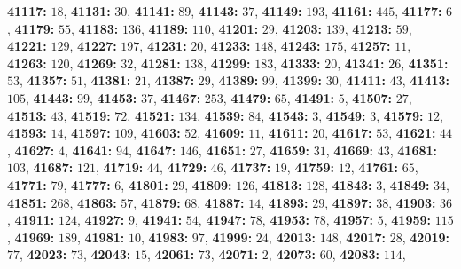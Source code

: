 \textsf{\bfseries 41117:} $18$, \textsf{\bfseries 41131:} $30$, \textsf{\bfseries 41141:} $89$, \textsf{\bfseries 41143:} $37$, \textsf{\bfseries 41149:} $193$, \textsf{\bfseries 41161:} $445$, \textsf{\bfseries 41177:} $6$, \textsf{\bfseries 41179:} $55$, \textsf{\bfseries 41183:} $136$, \textsf{\bfseries 41189:} $110$, \textsf{\bfseries 41201:} $29$, \textsf{\bfseries 41203:} $139$, \textsf{\bfseries 41213:} $59$, \textsf{\bfseries 41221:} $129$, \textsf{\bfseries 41227:} $197$, \textsf{\bfseries 41231:} $20$, \textsf{\bfseries 41233:} $148$, \textsf{\bfseries 41243:} $175$, \textsf{\bfseries 41257:} $11$, \textsf{\bfseries 41263:} $120$, \textsf{\bfseries 41269:} $32$, \textsf{\bfseries 41281:} $138$, \textsf{\bfseries 41299:} $183$, \textsf{\bfseries 41333:} $20$, \textsf{\bfseries 41341:} $26$, \textsf{\bfseries 41351:} $53$, \textsf{\bfseries 41357:} $51$, \textsf{\bfseries 41381:} $21$, \textsf{\bfseries 41387:} $29$, \textsf{\bfseries 41389:} $99$, \textsf{\bfseries 41399:} $30$, \textsf{\bfseries 41411:} $43$, \textsf{\bfseries 41413:} $105$, \textsf{\bfseries 41443:} $99$, \textsf{\bfseries 41453:} $37$, \textsf{\bfseries 41467:} $253$, \textsf{\bfseries 41479:} $65$, \textsf{\bfseries 41491:} $5$, \textsf{\bfseries 41507:} $27$, \textsf{\bfseries 41513:} $43$, \textsf{\bfseries 41519:} $72$, \textsf{\bfseries 41521:} $134$, \textsf{\bfseries 41539:} $84$, \textsf{\bfseries 41543:} $3$, \textsf{\bfseries 41549:} $3$, \textsf{\bfseries 41579:} $12$, \textsf{\bfseries 41593:} $14$, \textsf{\bfseries 41597:} $109$, \textsf{\bfseries 41603:} $52$, \textsf{\bfseries 41609:} $11$, \textsf{\bfseries 41611:} $20$, \textsf{\bfseries 41617:} $53$, \textsf{\bfseries 41621:} $44$, \textsf{\bfseries 41627:} $4$, \textsf{\bfseries 41641:} $94$, \textsf{\bfseries 41647:} $146$, \textsf{\bfseries 41651:} $27$, \textsf{\bfseries 41659:} $31$, \textsf{\bfseries 41669:} $43$, \textsf{\bfseries 41681:} $103$, \textsf{\bfseries 41687:} $121$, \textsf{\bfseries 41719:} $44$, \textsf{\bfseries 41729:} $46$, \textsf{\bfseries 41737:} $19$, \textsf{\bfseries 41759:} $12$, \textsf{\bfseries 41761:} $65$, \textsf{\bfseries 41771:} $79$, \textsf{\bfseries 41777:} $6$, \textsf{\bfseries 41801:} $29$, \textsf{\bfseries 41809:} $126$, \textsf{\bfseries 41813:} $128$, \textsf{\bfseries 41843:} $3$, \textsf{\bfseries 41849:} $34$, \textsf{\bfseries 41851:} $268$, \textsf{\bfseries 41863:} $57$, \textsf{\bfseries 41879:} $68$, \textsf{\bfseries 41887:} $14$, \textsf{\bfseries 41893:} $29$, \textsf{\bfseries 41897:} $38$, \textsf{\bfseries 41903:} $36$, \textsf{\bfseries 41911:} $124$, \textsf{\bfseries 41927:} $9$, \textsf{\bfseries 41941:} $54$, \textsf{\bfseries 41947:} $78$, \textsf{\bfseries 41953:} $78$, \textsf{\bfseries 41957:} $5$, \textsf{\bfseries 41959:} $115$, \textsf{\bfseries 41969:} $189$, \textsf{\bfseries 41981:} $10$, \textsf{\bfseries 41983:} $97$, \textsf{\bfseries 41999:} $24$, \textsf{\bfseries 42013:} $148$, \textsf{\bfseries 42017:} $28$, \textsf{\bfseries 42019:} $77$, \textsf{\bfseries 42023:} $73$, \textsf{\bfseries 42043:} $15$, \textsf{\bfseries 42061:} $73$, \textsf{\bfseries 42071:} $2$, \textsf{\bfseries 42073:} $60$, \textsf{\bfseries 42083:} $114$, 
